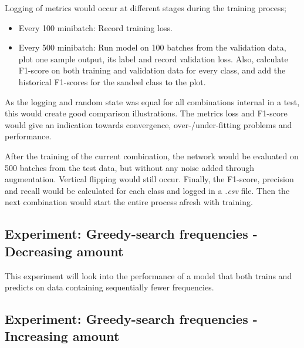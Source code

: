         Logging of metrics would occur at different stages during the training process;
            \begin{itemize}
                \item Every 100 minibatch: Record training loss.
                \item Every 500 minibatch: Run model on 100 batches from the validation data, plot one sample output, its label and record validation loss. Also, calculate F1-score on both training and validation data for every class, and add the historical F1-scores for the sandeel class to the plot. 
            \end{itemize}
    
        As the logging and random state was equal for all combinations internal in a test, this would create good comparison illustrations. The metrics loss and F1-score would give an indication towards convergence, over-/under-fitting problems and performance.
        
        After the training of the current combination, the network would be evaluated on 500 batches from the test data, but without any noise added through augmentation. Vertical flipping would still occur. Finally, the F1-score, precision and recall would be calculated for each class and logged in a \textit{.csv} file. Then the next combination would start the entire process afresh with training.
        
        
        
    \subsection{Experiment: Greedy-search frequencies - Decreasing amount}
        This experiment will look into the performance of a model that both trains and predicts on data containing sequentially fewer frequencies. 
        
        
    \subsection{Experiment: Greedy-search frequencies - Increasing amount}
    
        

